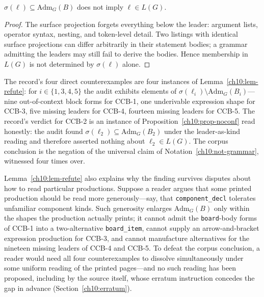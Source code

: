 \begin{proposition}\label{ch10:prop-noconf}
$\sigma(\ell)\subseteq\mathrm{Adm}_G(B)$ does not imply $\ell\in L(G)$.
\end{proposition}

\begin{proof}
The surface projection forgets everything below the leader: argument lists, operator syntax, nesting, and token-level detail. Two listings with identical surface projections can differ arbitrarily in their statement bodies; a grammar admitting the leaders may still fail to derive the bodies. Hence membership in $L(G)$ is not determined by $\sigma(\ell)$ alone.
\end{proof}

\begin{remark}\label{ch10:rem-formal}
The record's four direct counterexamples are four instances of Lemma~\ref{ch10:lem-refute}: for $i\in\{1,3,4,5\}$ the audit exhibits elements of $\sigma(\ell_i)\setminus\mathrm{Adm}_G(B_i)$---nine out-of-context block forms for CCB-1, one underivable expression shape for CCB-3, five missing leaders for CCB-4, fourteen missing leaders for CCB-5. The record's verdict for CCB-2 is an instance of Proposition~\ref{ch10:prop-noconf} read honestly: the audit found $\sigma(\ell_2)\subseteq\mathrm{Adm}_G(B_2)$ under the leader-as-kind reading and therefore asserted nothing about $\ell_2\in L(G)$. The corpus conclusion is the negation of the universal claim of Notation~\ref{ch10:not-grammar}, witnessed four times over.
\end{remark}

\begin{remark}\label{ch10:rem-robust}
Lemma~\ref{ch10:lem-refute} also explains why the finding survives disputes about how to read particular productions. Suppose a reader argues that some printed production should be read more generously---say, that \texttt{component\_decl} tolerates unfamiliar component kinds. Such generosity enlarges $\mathrm{Adm}_G(B)$ only within the shapes the production actually prints; it cannot admit the \texttt{board}-body forms of CCB-1 into a two-alternative \texttt{board\_item}, cannot supply an arrow-and-bracket expression production for CCB-3, and cannot manufacture alternatives for the nineteen missing leaders of CCB-4 and CCB-5. To defeat the corpus conclusion, a reader would need all four counterexamples to dissolve simultaneously under some uniform reading of the printed pages---and no such reading has been proposed, including by the source itself, whose erratum instruction concedes the gap in advance (Section~\ref{ch10:erratum}).
\end{remark}

